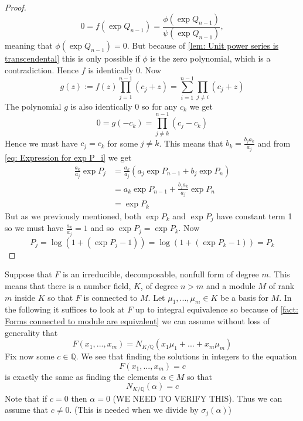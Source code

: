 \documentclass{article}
\DeclareMathOperator{\Gal}{Gal}
\newcommand{\mbb}[1]{\mathbb{#1}}
\begin{document}
\begin{proof}
    $$0 = f(\exp Q_{n-1}) = \frac{\phi(\exp Q_{n-1})}{\psi(\exp Q_{n-1})},$$
    meaning that $\phi(\exp Q_{n-1}) = 0$. But because of \cref{lem: Unit power series is transcendental} this is only possible if $\phi$ is the zero polynomial, which is a contradiction. Hence $f$ is identically 0. Now
    $$g(z) := f(z) \prod_{j=1}^{n-1}(c_j + z)  = \sum_{i = 1}^{n-1}\prod_{j \neq i}(c_j + z)$$
    The polynomial $g$ is also identically 0 so for any $c_k$ we get $$0 = g(-c_k) = \prod_{j \neq k}^{n-1} (c_j - c_k)$$
    Hence we must have $c_j = c_k$ for some $j \neq k$. This means that $b_k = \frac{b_j a_k}{a_j}$ and from \cref{eq: Expression for exp P_i} we get 
    \begin{align*}
        \frac{a_k}{a_j}\exp P_j &= \frac{a_k}{a_j}(a_j \exp P_{n-1} + b_j \exp P_n) \\
        &= a_k \exp P_{n-1} + \frac{b_j a_k}{a_j} \exp P_n \\ 
        &= \exp P_k
    \end{align*}
    But as we previously mentioned, both $\exp P_k$ and $\exp P_j$ have constant term 1 so we must have $\frac{a_k}{a_j} = 1$ and so $\exp P_j = \exp P_k$. Now 
    $$P_j = \log(1 + (\exp P_j - 1)) = \log(1 + (\exp P_k - 1)) = P_k$$
\end{proof}

Suppose that $F$ is an irreducible, decomposable, nonfull form of degree $m$. This means that there is a number field, $K$, of degree $n > m$ and a module $M$ of rank $m$ inside $K$ so that $F$ is connected to $M$. Let $\mu_1, ..., \mu_m \in K$ be a basis for $M$. In the following it suffices to look at $F$ up to integral equivalence so because of \cref{fact: Forms connected to module are equivalent} we can assume without loss of generality that
\begin{equation*}
    F(x_1, ..., x_m) = N_{K / \mbb Q}(x_1 \mu_1 + ... + x_m \mu_m)
\end{equation*}
Fix now some $c \in \mbb Q$. We see that finding the solutions in integers to the equation
\begin{equation}\label{eq: Initial equation of interest}
    F(x_1, ..., x_m) = c
\end{equation}
is exactly the same as finding the elements $\alpha \in M$ so that
\begin{equation}
    N_{K / \mbb Q}(\alpha) = c
\end{equation}
Note that if $c = 0$ then $\alpha = 0$ (WE NEED TO VERIFY THIS). Thus we can assume that $c \neq 0$. (This is needed when we divide by $\sigma_j(\alpha)$)
\end{document}
